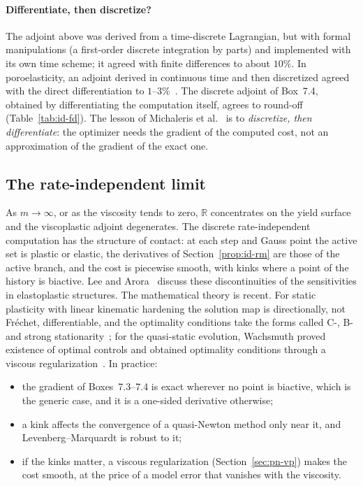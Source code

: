 \paragraph{Differentiate, then discretize?}
%
The adjoint above was derived from a time-discrete Lagrangian, but with formal
manipulations (a first-order discrete integration by parts) and implemented with
its own time scheme; it agreed with finite differences to about $10\%$. In
poroelasticity, an adjoint derived in continuous time and then discretized
agreed with the direct differentiation to $1$--$3\%$~\cite{LecampionConstantinescu2005}.
The discrete adjoint of Box~7.4, obtained by differentiating the computation
itself, agrees to round-off (Table~\ref{tab:id-fd}). The lesson of Michaleris et
al.~\cite{MichalerisTortorelliVidal1994} is to \emph{discretize, then
differentiate}: the optimizer needs the gradient of the computed cost, not an
approximation of the gradient of the exact one.

\subsection{The rate-independent limit}\label{ssec:id-limit}
%
As $m\to\infty$, or as the viscosity tends to zero, $\mathbb R$ concentrates on
the yield surface and the viscoplastic adjoint degenerates. The discrete
rate-independent computation has the structure of contact: at each step and
Gauss point the active set is plastic or elastic, the derivatives of
Section~\ref{prop:id-rm} are those of the active branch, and the cost is piecewise
smooth, with kinks where a point of the history is biactive. Lee and
Arora~\cite{LeeArora1995} discuss these discontinuities of the sensitivities in
elastoplastic structures. The mathematical theory is recent. For static
plasticity with linear kinematic hardening the solution map is directionally,
not Fr\'echet, differentiable, and the optimality conditions take the forms
called C-, B- and strong stationarity~\cite{HerzogMeyerWachsmuth2012,HerzogMeyerWachsmuth2013};
for the quasi-static evolution, Wachsmuth proved existence of optimal controls
and obtained optimality conditions through a viscous
regularization~\cite{Wachsmuth2012,Wachsmuth2015,Wachsmuth2016}. In practice:
\begin{itemize}
  \item the gradient of Boxes~7.3--7.4 is exact wherever no point is biactive,
  which is the generic case, and it is a one-sided derivative otherwise;
  \item a kink affects the convergence of a quasi-Newton method only near it, and
  Levenberg--Marquardt is robust to it;
  \item if the kinks matter, a viscous regularization (Section~\ref{sec:pn-vp})
  makes the cost smooth, at the price of a model error that vanishes with the
  viscosity.
\end{itemize}

